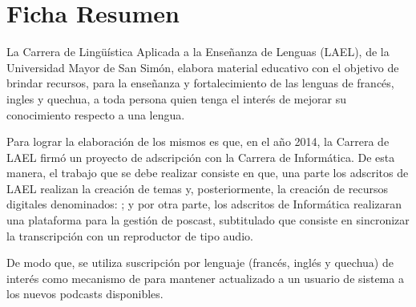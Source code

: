 \cleardoublepage
\hypertarget{Ficha Resumen}{}

\chapter*{Ficha Resumen}

La Carrera de Lingüística Aplicada a la Enseñanza de Lenguas (LAEL), de la
Universidad Mayor de San Simón, elabora material educativo con el objetivo de
brindar recursos, para la enseñanza y fortalecimiento de las lenguas de
francés, ingles y quechua, a toda persona quien tenga el interés de mejorar
su conocimiento respecto a una lengua.

Para lograr la elaboración de los mismos es que, en el año 2014, la Carrera de
LAEL firmó un proyecto de adscripción con la Carrera de Informática. De esta
manera, el trabajo que se debe realizar consiste en que, una parte los
adscritos de LAEL realizan la creación de temas y, posteriormente, la creación
de recursos digitales denominados: ; y por
otra parte, los adscritos de Informática realizaran una plataforma para la
gestión de poscast, subtitulado que consiste en sincronizar la transcripción
con un reproductor de tipo audio.

De modo que, se utiliza suscripción por lenguaje (francés, inglés y quechua) de
interés como mecanismo de para mantener actualizado a un usuario de sistema a
los nuevos podcasts disponibles. 